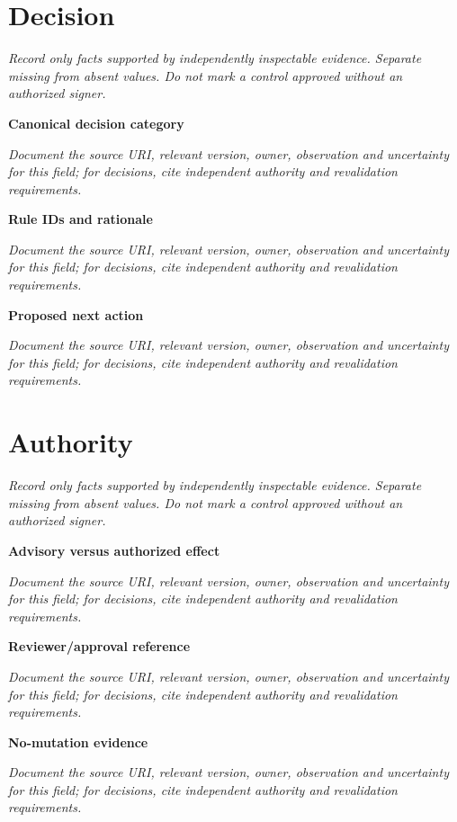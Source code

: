 \documentclass[11pt,letterpaper]{article}
\begin{document}
\section{Decision}
\noindent\emph{Record only facts supported by independently inspectable evidence. Separate missing from absent values. Do not mark a control approved without an authorized signer.}\par
\noindent\textbf{Canonical decision category}\par
\noindent\emph{Document the source URI, relevant version, owner, observation and uncertainty for this field; for decisions, cite independent authority and revalidation requirements.}\par\medskip
\noindent\textbf{Rule IDs and rationale}\par
\noindent\emph{Document the source URI, relevant version, owner, observation and uncertainty for this field; for decisions, cite independent authority and revalidation requirements.}\par\medskip
\noindent\textbf{Proposed next action}\par
\noindent\emph{Document the source URI, relevant version, owner, observation and uncertainty for this field; for decisions, cite independent authority and revalidation requirements.}\par\medskip
\section{Authority}
\noindent\emph{Record only facts supported by independently inspectable evidence. Separate missing from absent values. Do not mark a control approved without an authorized signer.}\par
\noindent\textbf{Advisory versus authorized effect}\par
\noindent\emph{Document the source URI, relevant version, owner, observation and uncertainty for this field; for decisions, cite independent authority and revalidation requirements.}\par\medskip
\noindent\textbf{Reviewer/approval reference}\par
\noindent\emph{Document the source URI, relevant version, owner, observation and uncertainty for this field; for decisions, cite independent authority and revalidation requirements.}\par\medskip
\noindent\textbf{No-mutation evidence}\par
\noindent\emph{Document the source URI, relevant version, owner, observation and uncertainty for this field; for decisions, cite independent authority and revalidation requirements.}\par\medskip
\end{document}
